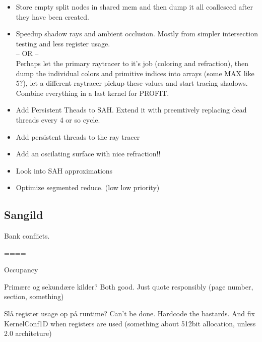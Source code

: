 \begin{itemize}
\item Store empty split nodes in shared mem and then dump it all
  coallesced after they have been created.
\item Speedup shadow rays and ambient occlusion. Mostly from simpler
  intersection testing and less register usage.\\ -- OR -- \\ Perhaps
  let the primary raytracer to it's job (coloring and refraction),
  then dump the individual colors and primitive indices into arrays
  (some MAX like 5?), let a different raytracer pickup these values
  and start tracing shadows. Combine everything in a last kernel for
  PROFIT.
\item Add Persistent Theads to SAH. Extend it with preemtively
  replacing dead threads every 4 or so cycle.
\item Add persistent threads to the ray tracer
\item Add an oscilating surface with nice refraction!!
\item Look into SAH approximations
\item Optimize segmented reduce. (low low priority)
\end{itemize}




\subsection*{Sangild}

Bank conflicts.

====

Occupancy

Primære og sekundære kilder? Both good. Just quote responsibly (page
number, section, something)

Slå register usage op på runtime? Can't be done. Hardcode the
bastards. And fix KernelConf1D when registers are used (something
about 512bit allocation, unless 2.0 architeture)

